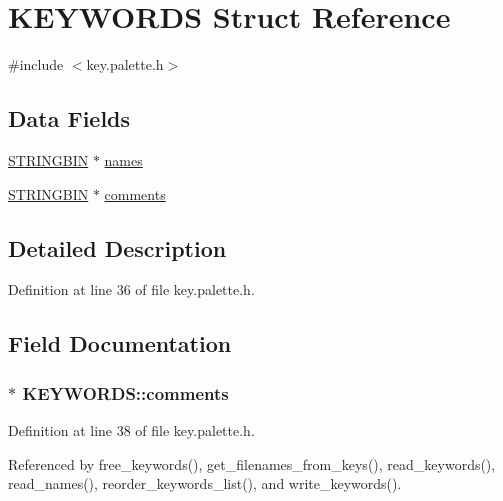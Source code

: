 \hypertarget{struct_k_e_y_w_o_r_d_s}{\section{K\-E\-Y\-W\-O\-R\-D\-S Struct Reference}
\label{struct_k_e_y_w_o_r_d_s}
}


{\ttfamily \#include $<$key.\-palette.\-h$>$}

\subsection*{Data Fields}
\begin{DoxyCompactItemize}
\item 
\hyperlink{turtle_8h_ade34e6dff3489a3ddd297f003f01bbd2}{S\-T\-R\-I\-N\-G\-B\-I\-N} $\ast$ \hyperlink{struct_k_e_y_w_o_r_d_s_ae1fbc7cb94e32783153884b8b5ca6b6b}{names}
\item 
\hyperlink{turtle_8h_ade34e6dff3489a3ddd297f003f01bbd2}{S\-T\-R\-I\-N\-G\-B\-I\-N} $\ast$ \hyperlink{struct_k_e_y_w_o_r_d_s_a0bd9c107aa5e17c5caf35b931396fd87}{comments}
\end{DoxyCompactItemize}


\subsection{Detailed Description}


Definition at line 36 of file key.\-palette.\-h.



\subsection{Field Documentation}
\hypertarget{struct_k_e_y_w_o_r_d_s_a0bd9c107aa5e17c5caf35b931396fd87}{
\subsubsection[{comments}]{$\ast$ K\-E\-Y\-W\-O\-R\-D\-S\-::comments}}\label{struct_k_e_y_w_o_r_d_s_a0bd9c107aa5e17c5caf35b931396fd87}


Definition at line 38 of file key.\-palette.\-h.



Referenced by free\-\_\-keywords(), get\-\_\-filenames\-\_\-from\-\_\-keys(), read\-\_\-keywords(), read\-\_\-names(), reorder\-\_\-keywords\-\_\-list(), and write\-\_\-keywords().

